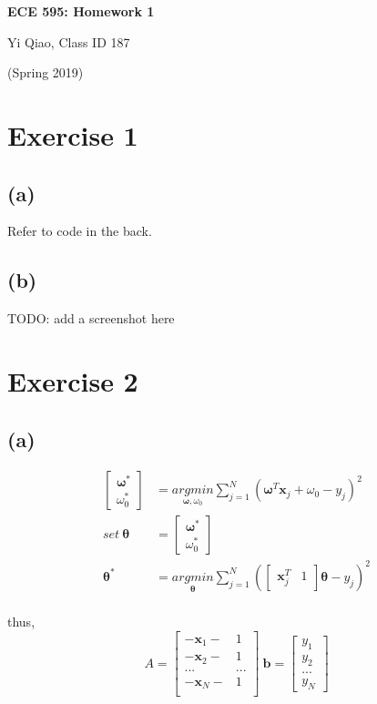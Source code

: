 \documentclass[11pt]{article}
\begin{document}
\begin{center}
\Large{\textbf{ECE 595: Homework 1}}

Yi Qiao, Class ID 187

(Spring 2019)
\end{center}

\section*{Exercise 1}
\subsection*{(a)}
Refer to code in the back. 
\subsection*{(b)}
TODO: add a screenshot here

\section*{Exercise 2}
\subsection*{(a)}
\begin{equation}	\label{eq2(a)}
\begin{split}
\begin{bmatrix}\pmb{\omega}^*\\ \omega^*_0\end{bmatrix}
&=\underset{\pmb{\omega},\omega_0}{argmin}\sum_{j=1}^N(\pmb{\omega}^T\pmb{x}_j+\omega_0-y_j)^2\\
set\ \pmb{\theta}&=\begin{bmatrix}\pmb{\omega}^*\\ \omega^*_0\end{bmatrix}\\
\pmb{\theta}^*&=\underset{\pmb{\theta}}{argmin}\sum_{j=1}^N(\begin{bmatrix}\pmb{x}_j^T & 1\end{bmatrix}\pmb{\theta}-y_j)^2\\
\end{split}
\end{equation}
\begin{center}
thus,\\
$$A=\begin{bmatrix}
-\pmb{x}_1- & 1\\
-\pmb{x}_2- & 1\\
...& ...\\
-\pmb{x}_N- & 1\\
\end{bmatrix}\ 
\pmb{b}=\begin{bmatrix}
y_1\\
y_2\\
...\\
y_N
\end{bmatrix}$$
\end{center}
\end{document}
